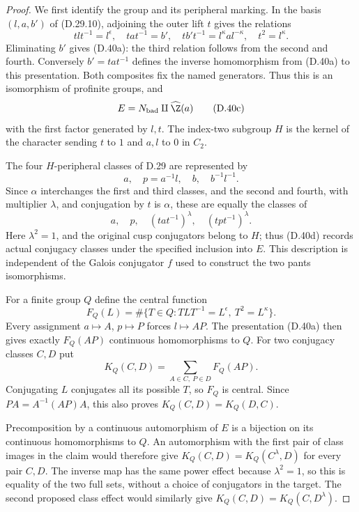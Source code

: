 \begin{proof}
We first identify the group and its peripheral marking.
In the basis $(l,a,b')$ of (D.29.10), adjoining the outer
lift $t$ gives the relations
\[
 tlt^{-1}=l^\epsilon,\quad tat^{-1}=b',\quad
 tb't^{-1}=l^\kappa a l^{-\kappa},\quad t^2=l^\kappa.
\]
Eliminating $b'$ gives (D.40a): the third relation follows
from the second and fourth. Conversely $b'=tat^{-1}$
defines the inverse homomorphism from (D.40a) to this
presentation. Both composites fix the named generators.
Thus this is an isomorphism of profinite groups, and
\[
                         E=N_{\rm bad}\amalg\widehat\Z(a)
                                                        \tag{D.40c}
\]
with the first factor generated by $l,t$.
The index-two subgroup $H$ is the kernel of the character
sending $t$ to $1$ and $a,l$ to $0$ in $C_2$.

The four $H$-peripheral classes of D.29 are represented by
\[
 a,\quad p=a^{-1}l,\quad b,\quad b^{-1}l^{-1}.
\]
Since $\alpha$ interchanges the first and third classes,
and the second and fourth, with multiplier $\lambda$,
and conjugation by $t$ is $\alpha$, these are equally
the classes of
\[
 a,\quad p,\quad (tat^{-1})^\lambda,
                         \quad(tpt^{-1})^\lambda.       \tag{D.40d}
\]
Here $\lambda^2=1$, and the original cusp conjugators
belong to $H$; thus (D.40d) records actual conjugacy
classes under the specified inclusion into $E$.
This description is independent of the Galois conjugator
$f$ used to construct the two pants isomorphisms.

For a finite group $Q$ define the central function
\[
 F_Q(L)=\#\{T\in Q:T L T^{-1}=L^\epsilon,
                                      \ T^2=L^\kappa\}.
                                                        \tag{D.40e}
\]
Every assignment $a\mapsto A$, $p\mapsto P$ forces
$l\mapsto AP$. The presentation (D.40a) then gives
exactly $F_Q(AP)$ continuous homomorphisms to $Q$.
For two conjugacy classes $C,D$ put
\[
             K_Q(C,D)=\sum_{A\in C,\ P\in D}F_Q(AP).
                                                        \tag{D.40f}
\]
Conjugating $L$ conjugates all its possible $T$, so
$F_Q$ is central. Since $PA=A^{-1}(AP)A$, this also proves
$K_Q(C,D)=K_Q(D,C)$.

Precomposition by a continuous automorphism of $E$ is
a bijection on its continuous homomorphisms to $Q$.
An automorphism with the first pair of class images in
the claim would therefore give
$K_Q(C,D)=K_Q(C^\lambda,D)$ for every pair $C,D$.
The inverse map has the same power effect because
$\lambda^2=1$, so this is equality of the two full sets,
without a choice of conjugators in the target.
The second proposed class effect would similarly give
$K_Q(C,D)=K_Q(C,D^\lambda)$.


\end{proof}
